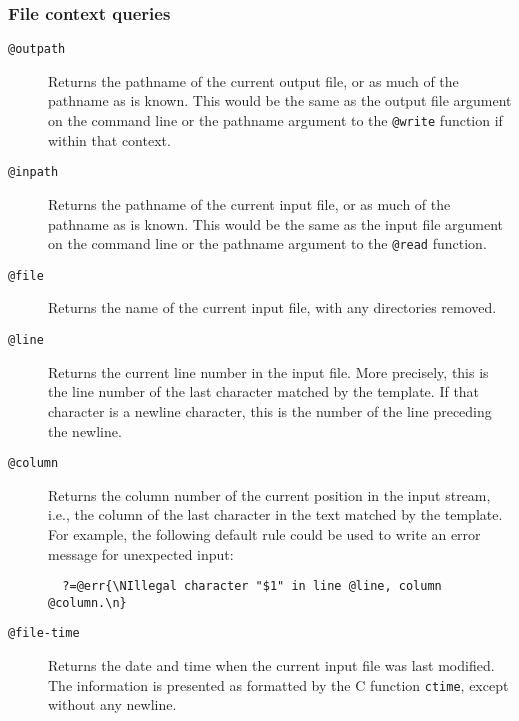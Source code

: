 \subsubsection{File context queries}
\begin{description}

\item[{\tt @outpath\ttlb\ttrb}]
Returns the pathname of the current output file, or as much of the
pathname as is known.  This would be the same as the output file
argument on the command line or the pathname argument to the
\verb/@write/ function if within that context.

\item[{\tt @inpath\ttlb\ttrb}]
Returns the pathname of the current input file, or as much of
the pathname as is known.  This would be the same as the input file
argument on the command line or the pathname argument to the
\verb/@read/ function.

\item[{\tt @file\ttlb\ttrb}]
Returns the name of the current input file, with any directories removed.

\item[{\tt @line\ttlb\ttrb}]
Returns the current line number in the input file.
More precisely, this is the line number of the last character matched by
the template.  If that character is a newline character, this is the
number of the line preceding the newline.

\item[{\tt @column\ttlb\ttrb}]
Returns the column number of the current position in the input stream,
i.e., the column of the last character in the text matched by the
template.
For example, the following default rule could be used to write an error
message for unexpected input:
\begin{verbatim}
  ?=@err{\NIllegal character "$1" in line @line, column @column.\n}
\end{verbatim}

\item[{\tt @file-time\ttlb\ttrb}]
Returns the date and time when the current input file was last modified.
The information is presented as formatted by the C function
{\tt ctime}, except without any newline.
\end{description}

\pagebreak[3]
